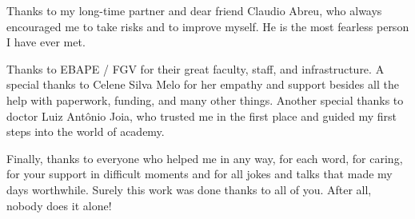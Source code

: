 Thanks to my long-time partner and dear friend Claudio Abreu, who always encouraged me to take risks and to improve myself. He is the most fearless person I have ever met.

Thanks to EBAPE / FGV for their great faculty, staff, and infrastructure. A special thanks to Celene Silva Melo for her empathy and support besides all the help with paperwork, funding, and many other things. Another special thanks to doctor Luiz Antônio Joia, who trusted me in the first place and guided my first steps into the world of academy.

Finally, thanks to everyone who helped me in any way, for each word, for caring, for your support in difficult moments and for all jokes and talks that made my days worthwhile. Surely this work was done thanks to all of you. After all, nobody does it alone!

\bigskip


\endgroup
